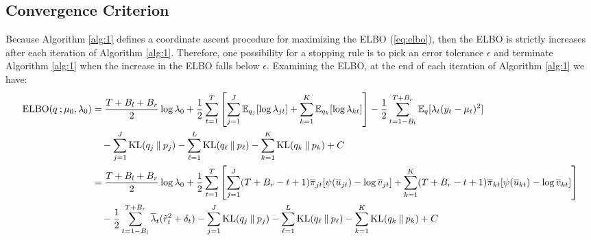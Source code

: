 \subsection{Convergence Criterion}
\label{app:convergence}

Because Algorithm \ref{alg:1} defines a coordinate ascent procedure for maximizing the ELBO (\ref{eq:elbo}), then the ELBO is strictly increases after each iteration of Algorithm \ref{alg:1}. Therefore, one possibility for a stopping rule is to pick an error tolerance $\epsilon$ and terminate Algorithm \ref{alg:1} when the increase in the ELBO falls below $\epsilon$. Examining the ELBO, at the end of each iteration of Algorithm \ref{alg:1} we have: 
\scriptsize
\begin{align*} 
    \text{ELBO}(q\:;\mu_0,\lambda_0) &= \frac{T + B_l + B_r}{2} \log \lambda_0 + \frac{1}{2}\sum_{t=1}^T \left[\sum_{j=1}^J \mathbb{E}_{q_j}[\log \lambda_{jt}]+ \sum_{k=1}^K \mathbb{E}_{q_k}[\log \lambda_{kt}]\right] - \frac{1}{2} \sum_{t=1-B_l}^{T+B_r} \mathbb{E}_q[\lambda_t(y_t -\mu_t)^2] \\
    &\quad - \sum_{j=1}^J \text{KL}(q_j\:\lVert\: p_j) - \sum_{\ell=1}^L \text{KL}(q_\ell\:\lVert\: p_\ell) - \sum_{k=1}^K \text{KL}(q_k\:\lVert\: p_k) +C \\
    &= \frac{T + B_l + B_r}{2} \log \lambda_0 + \frac{1}{2}\sum_{t=1}^T \left[\sum_{j=1}^J (T+B_r-t+1)\overline{\pi}_{jt}[\psi(\overline{u}_{jt}) - \log\overline{v}_{jt}]+ \sum_{k=1}^K(T+B_r-t+1)\overline{\pi}_{kt}[\psi(\overline{u}_{kt}) - \log\overline{v}_{kt}]\right] \\
    &\quad- \frac{1}{2} \sum_{t=1-B_l}^{T+B_r} \overline{\lambda}_t(\Tilde{r}_t^2 + \delta_t) - \sum_{j=1}^J \text{KL}(q_j\:\lVert\: p_j) - \sum_{\ell=1}^L \text{KL}(q_\ell\:\lVert\: p_\ell) - \sum_{k=1}^K \text{KL}(q_k\:\lVert\: p_k) +C
\end{align*}
\normalsize
